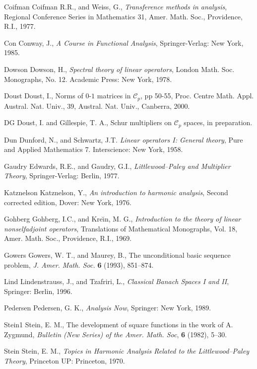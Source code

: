 \documentclass[mstat,12pt]{unswthesis}  %
\newcommand{\CC}{\mathcal{C}}
\numberwithin{equation}{section}
\begin{document}
\begin{thebibliography}{999}
\bibitem
{Coifman} Coifman R.R., and Weiss, G.,
\textit{Transference methods in analysis},
Regional Conference Series in Mathematics 31,
Amer. Math. Soc., Providence, R.I., 1977.

\bibitem
{Con} Conway, J.,
\textit{A Course in Functional Analysis},
Springer-Verlag: New York, 1985.

\bibitem
{Dowson} Dowson, H.,
\textit{Spectral theory of linear operators},
London Math. Soc. Monographs, No. 12. Academic Press: New York, 1978.

\bibitem
{Doust} 
Doust, I., Norms of $0$-$1$ matrices in $\CC_p$,  pp 50-55, Proc.
Centre Math. Appl. Austral. Nat. Univ., 39, Austral. Nat. Univ.,
Canberra, 2000.

\bibitem
{DG} Doust, I.  and Gillespie, T. A.,
Schur multipliers on $\CC_p$ spaces,
in preparation.

\bibitem
{Dun} Dunford, N., and Schwartz, J.T.
\textit{Linear operators I: General theory},
Pure and Applied Mathematics 7. Interscience: New York, 1958.

\bibitem
{Gaudry} Edwards, R.E., and Gaudry, G.I.,
\textit{Littlewood--Paley and Multiplier Theory},
Springer-Verlag: Berlin, 1977.

\bibitem
{Katznelson}
Katznelson, Y.,
\textit{An introduction to harmonic analysis},
Second corrected edition, Dover: New York, 1976.

\bibitem
{Gohberg}
Gohberg, I.C., and Kre\u{\i}n, M. G.,
\textit{Introduction to the theory of linear nonselfadjoint operators},
Translations of Mathematical Monographs, Vol. 18, Amer. Math. Soc.,
Providence, R.I., 1969.

\bibitem
{Gowers} Gowers, W. T., and Maurey, B.,
The unconditional basic sequence problem,
\textit{J. Amer. Math. Soc.} \textbf{6} (1993), 851--874.

\bibitem
{Lind}
Lindenstrauss, J., and Tzafriri, L.,
\textit{Classical Banach Spaces I and II},
Springer: Berlin, 1996.

\bibitem
{Pedersen}
Pedersen, G. K.,
\textit{Analysis Now},
Springer: New York, 1989.

\bibitem
{Stein1}
Stein, E. M.,
The development of square functions in the work of A. Zygmund,
\textit{Bulletin (New Series) of the Amer. Math. Soc},
\textbf{6} (1982), 5--30.

\bibitem
{Stein}
Stein, E. M.,
\textit{Topics in Harmonic Analysis Related to the Littlewood--Paley Theory},
Princeton UP: Princeton, 1970.

\end{thebibliography}
\end{document}
